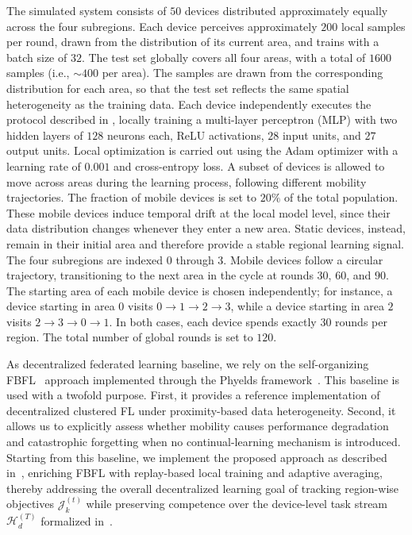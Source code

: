 \documentclass[conference]{IEEEtran}
\theoremstyle{plain}
\theoremstyle{definition}
\begin{document}
The simulated system consists of $50$ devices distributed approximately equally across the four subregions.
%
Each device perceives approximately $200$ local samples per round,
 drawn from the distribution of its current area,
 and trains with a batch size of $32$.
%
The test set globally covers all four areas,
 with a total of $1600$ samples (i.e., $\sim 400$ per area).
The samples are drawn from the corresponding distribution for each area, 
 so that the test set reflects the same spatial heterogeneity as the training data.
%
Each device independently executes the protocol described in ,
 locally training a multi-layer perceptron (MLP) with two hidden layers of $128$ neurons each,
 ReLU activations, $28$ input units, and $27$ output units.
Local optimization is carried out using the Adam optimizer
 with a learning rate of $0.001$ and cross-entropy loss.
%
A subset of devices is allowed to move across areas during the learning process,
 following different mobility trajectories.
%
The fraction of mobile devices is set to $20\%$ of the total population. %
%
These mobile devices induce temporal drift at the local model level,
 since their data distribution changes whenever they enter a new area.
%
Static devices, instead,
 remain in their initial area and therefore provide a stable regional learning signal.
%
The four subregions are indexed $0$ through $3$.
Mobile devices follow a circular trajectory, transitioning to the next area
in the cycle at rounds $30$, $60$, and $90$.
The starting area of each mobile device is chosen independently;
for instance, a device starting in area $0$ visits $0 \to 1 \to 2 \to 3$,
while a device starting in area $2$ visits $2 \to 3 \to 0 \to 1$.
In both cases, each device spends exactly $30$ rounds per region.
The total number of global rounds is set to $120$.

As decentralized federated learning baseline,
 we rely on the self-organizing FBFL~\cite{DBLP:journals/lmcs/DominiAEV26} approach
 implemented through the Phyelds framework~\cite{DBLP:journals/corr/abs-2603-29999}.
%
This baseline is used with a twofold purpose.
%
First,
 it provides a reference implementation of decentralized clustered FL
 under proximity-based data heterogeneity.
%
Second,
 it allows us to explicitly assess whether mobility causes performance degradation
 and catastrophic forgetting when no continual-learning mechanism is introduced.
%
Starting from this baseline,
 we implement the proposed \approach{} approach as described in~,
 enriching FBFL with replay-based local training
 and adaptive averaging,
 thereby addressing the overall decentralized learning goal of
 tracking region-wise objectives $\mathcal{J}_k^{(t)}$ while
 preserving competence over the device-level task stream $\mathcal{H}_d^{(T)}$
 formalized in~.
\end{document}
